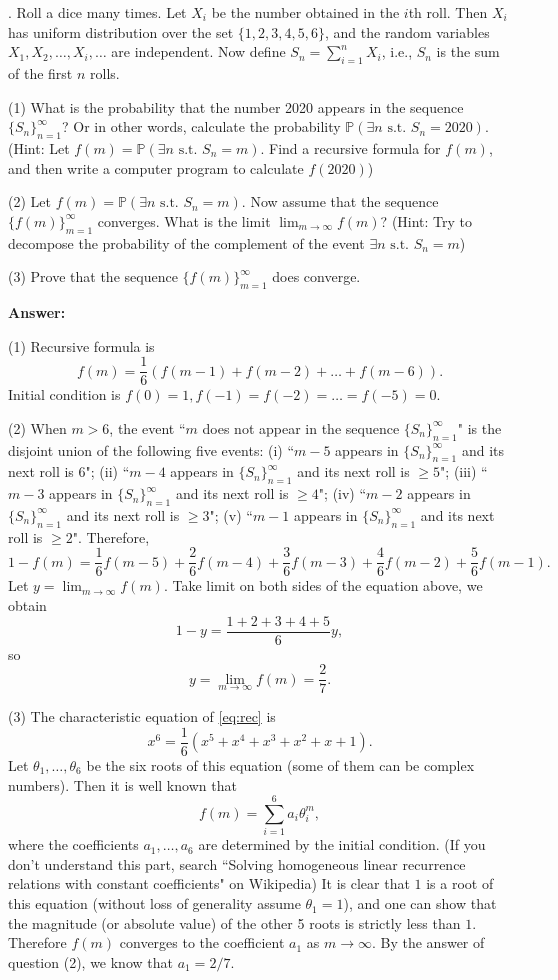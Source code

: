 \documentclass[onecolumn, 12pt]{IEEEtran}
\begin{document}
. Roll a dice many times. Let $X_i$ be the number obtained in the $i$th roll. Then $X_i$ has uniform distribution over the set $\{1,2,3,4,5,6\}$, and the random variables $X_1,X_2,\dots,X_i,\dots$ are independent.
Now define $S_n=\sum_{i=1}^n X_i$, i.e., $S_n$ is the sum of the first $n$ rolls.

\noindent
(1) What is the probability that the number 2020 appears in the sequence $\{S_n\}_{n=1}^\infty$? Or in other words, calculate the probability 
$
\mathbb{P}(\exists n \text{~s.t.~} S_n=2020) .
$
(Hint: Let $f(m)=\mathbb{P}(\exists n \text{~s.t.~} S_n=m)$. Find a recursive formula for $f(m)$, and then write a computer program to calculate $f(2020)$)

\noindent
(2) Let $f(m)=\mathbb{P}(\exists n \text{~s.t.~} S_n=m)$. Now assume that the sequence $\{f(m)\}_{m=1}^\infty$ converges. What is the limit $\lim_{m\to\infty} f(m)$?
(Hint: Try to decompose the probability of the complement of the event $\exists n \text{~s.t.~} S_n=m$)

\noindent
(3) Prove that the sequence $\{f(m)\}_{m=1}^\infty$ does converge.


\vspace*{0.3in}
\noindent
{\bf Answer:}

\noindent
(1) Recursive formula is 
\begin{equation}  \label{eq:rec}
f(m)=\frac{1}{6}(f(m-1)+f(m-2)+\dots+f(m-6)).
\end{equation}
Initial condition is $f(0)=1,f(-1)=f(-2)=\dots=f(-5)=0$.



\noindent
(2) When $m>6$, the event ``$m$ does not appear in the sequence $\{S_n\}_{n=1}^\infty$" is the disjoint union of the following five events:
(i) ``$m-5$ appears in $\{S_n\}_{n=1}^\infty$ and its next roll is 6"; (ii) ``$m-4$ appears in $\{S_n\}_{n=1}^\infty$ and its next roll is $\ge 5$"; (iii) ``$m-3$ appears in $\{S_n\}_{n=1}^\infty$ and its next roll is $\ge 4$"; (iv) ``$m-2$ appears in $\{S_n\}_{n=1}^\infty$ and its next roll is $\ge 3$"; (v) ``$m-1$ appears in $\{S_n\}_{n=1}^\infty$ and its next roll is $\ge 2$". Therefore,
$$
1-f(m)=\frac{1}{6}f(m-5) +  \frac{2}{6}f(m-4)
+ \frac{3}{6}f(m-3) + \frac{4}{6}f(m-2) + \frac{5}{6}f(m-1) .
$$
Let $y=\lim_{m\to\infty} f(m)$. Take limit on both sides of the equation above, we obtain
$$
1-y=\frac{1+2+3+4+5}{6}y ,
$$
so
$$
y=\lim_{m\to\infty} f(m)=\frac{2}{7} .
$$


\noindent
(3) The characteristic equation of \eqref{eq:rec} is 
$$
x^6=\frac{1}{6}(x^5+x^4+x^3+x^2+x+1) .
$$
Let $\theta_1,\dots,\theta_6$ be the six roots of this equation (some of them can be complex numbers). Then it is well known that 
$$
f(m)=\sum_{i=1}^6 a_i \theta_i^m ,
$$
where the coefficients $a_1,\dots,a_6$ are determined by the initial condition.
(If you don't understand this part, search ``Solving homogeneous linear recurrence relations with constant coefficients" on Wikipedia)
It is clear that $1$ is a root of this equation (without loss of generality assume $\theta_1=1$), and one can show that the magnitude (or absolute value) of the other 5 roots is strictly less than $1$. Therefore $f(m)$ converges to the coefficient $a_1$ as $m\to\infty$. By the answer of question (2), we know that $a_1=2/7$.
\end{document}
